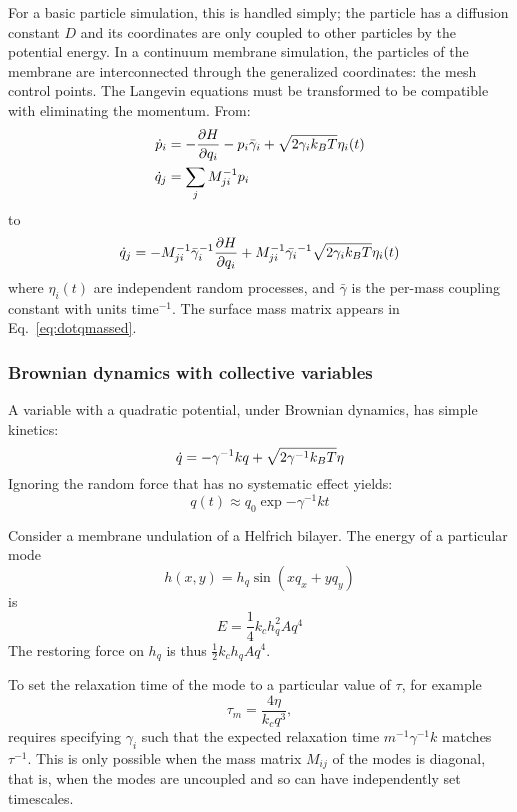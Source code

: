 For a basic particle simulation, this is handled simply; the particle has a diffusion constant $D$ and its coordinates are only coupled to other particles by the potential energy.
In a continuum membrane simulation, the particles of the membrane are interconnected through the generalized coordinates: the mesh control points.
The Langevin equations must be transformed to be compatible with eliminating the momentum.
From:
\begin{align}
\dot{p}_i &= -\frac{\partial H}{\partial q_i} -p_i \bar{\gamma}_i + \sqrt{2 \gamma_i k_B T} \eta_i(t) \nonumber \\
\dot{q}_j &= \sum_j M_{ji}^{-1} p_i
\end{align}
to
\begin{equation}
\dot{q}_j = -M_{ji}^{-1} \bar{\gamma}_i^{-1} \frac{\partial H}{\partial q_i} + M_{ji}^{-1}\bar{\gamma_i}^{-1}\sqrt{2 \gamma_i k_B T}\eta_i(t)
\label{eq:dotqmassed}
\end{equation}
where $\eta_i(t)$ are independent random processes, and $\bar{\gamma}$ is the per-mass coupling constant with units time$^{-1}$.
The surface mass matrix appears in Eq.~\ref{eq:dotqmassed}. 



\subsubsection{Brownian dynamics with collective variables}


A variable with a quadratic potential, under Brownian dynamics, has simple kinetics:
\begin{equation}
\dot{q} = -\gamma^{-1} k q + \sqrt{ 2 \gamma^{-1} k_B T } \eta
\end{equation}
Ignoring the random force that has no systematic effect yields:
\begin{equation}
q(t) \approx q_0 \exp{-\gamma^{-1} k t}
\end{equation}

Consider a membrane undulation of a Helfrich bilayer.
The energy of a particular mode
\begin{equation}
h(x,y) = h_q \sin(x q_x + y q_y )
\end{equation}
is
\begin{equation}
E = \frac{1}{4} k_c h_q^2 A q^4
\end{equation}
The restoring force on $h_q$ is thus $\frac{1}{2} k_c h_q A q^4$.

To set the relaxation time of the mode to a particular value of $\tau$, for example
\begin{equation}
\tau_m = \frac{4 \eta}{k_c q^3},
\end{equation}
requires specifying $\gamma_i$ such that the expected relaxation time $m^{-1} \gamma^{-1} k$ matches $\tau^{-1}$.
This is only possible when the mass matrix $M_{ij}$ of the modes is diagonal, that is, when the modes are uncoupled and so can have independently set timescales.











